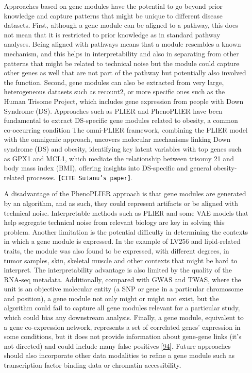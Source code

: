 Approaches based on gene modules have the potential to go beyond prior knowledge and capture patterns that might be unique to different disease datasets.
First, although a gene module can be aligned to a pathway, this does not mean that it is restricted to prior knowledge as in standard pathway analyses.
Being aligned with pathways means that a module resembles a known mechanism, and this helps in interpretability and also in separating from other patterns that might be related to technical noise but the module could capture other genes as well that are not part of the pathway but potentially also involved the function.
Second, gene modules can also be extracted from very large, heterogeneous datasets such as recount2, or more specific ones such as the Human Trisome Project, which includes gene expression from people with Down Syndrome (DS).
Approaches such as PLIER and PhenoPLIER have been fundamental to extract DS-specific gene modules related to obesity, a common co-occurring condition The omni-PLIER framework, combining the PLIER model with the omnigenic approach, uncovers molecular mechanisms linking Down syndrome (DS) and obesity, identifying key latent variables with top genes such as GPX1 and MCL1, which mediate the relationship between trisomy 21 and body mass index (BMI), offering insights into DS-specific and general obesity-related processes. \texttt{{[}CITE\ Sutanu’s\ paper{]}}.

A disadvantage of the PhenoPLIER approach is that gene modules are generated by an algorithm, and as such, they could represent artifacts or be aligned with technical noise.
Interpretable methods such as PLIER and some VAE models that help segregate technical noise from relevant biology are key in solving this problem.
Another limitation is the potential difficulty in determining the contexts in which a gene module is expressed.
In the example of LV256 and lipid-related traits, the module was also found to be expressed, with different degrees, in tumor samples, skin, skeletal muscle and other contexts that might be hard to interpret.
The interpretability advantage is also limited by the quality of the RNA-seq metadata.
Additionally, compared with GWAS and TWAS, where the unit is an objective molecular entity (a SNP or gene in a particular chromosome and position), a gene module not only might or might not exist, but the algorithm could fail to capture all gene modules relevant for a particular study, which could bias any downstream analysis.
Finally, a gene module, equivalent to a gene co-expression network, represents a set of correlated genes' expression in some conditions, but it does not provide information about gene-gene links (it's not directed) and could include many false positives {[}\protect\hyperlink{ref-jVQ2rMqc}{94}{]}.
Future approaches should also incorporate other data modalities to refine a gene module such as transcription factor binding data or chromatin accessibility.

